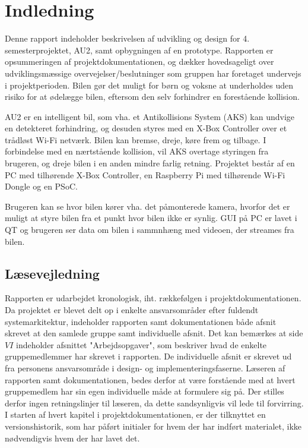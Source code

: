 \chapter{Indledning}
\label{ch:Indledning}

Denne rapport indeholder beskrivelsen af udvikling og design for 4. semesterprojektet, AU2, samt opbygningen af en prototype. 
Rapporten er opsummeringen af projektdokumentationen, og dækker hovedsageligt over udviklingsmæssige overvejelser/beslutninger som gruppen har foretaget undervejs i projektperioden. 
Bilen gør det muligt for børn og voksne at underholdes uden risiko for at ødelægge bilen, eftersom den selv forhindrer en forestående kollision.

AU2 er en intelligent bil, som vha. et Antikollisions System (AKS) kan undvige en detekteret forhindring, og desuden styres med en X-Box Controller over et trådløst Wi-Fi netværk. Bilen kan bremse, dreje, køre frem og tilbage.
I forbindelse med en nærtstående kollision, vil AKS overtage styringen fra brugeren, og dreje bilen i en anden mindre farlig retning. 
Projektet består af en PC med tilhørende X-Box Controller, en Raspberry Pi med tilhørende Wi-Fi Dongle og en PSoC. 

Brugeren kan se hvor bilen kører vha. det påmonterede kamera, hvorfor det er muligt at styre bilen fra et punkt hvor bilen ikke er synlig.
GUI på PC er lavet i QT og brugeren ser data om bilen i sammnhæng med videoen, der streames fra bilen.

\section{Læsevejledning}
Rapporten er udarbejdet kronologisk, iht. rækkefølgen i projektdokumentationen. 
Da projektet er blevet delt op i enkelte ansvarsområder efter fuldendt systemarkitektur, indeholder rapporten samt dokumentationen både afsnit skrevet at den samlede gruppe samt individuelle afsnit. 
Det kan bemærkes at side $VI$ indeholder afsnittet "Arbejdsopgaver", som beskriver hvad de enkelte gruppemedlemmer har skrevet i rapporten. 
De individuelle afsnit er skrevet ud fra personens ansvarsområde i design- og implementeringsfaserne. 
Læseren af rapporten samt dokumentationen, bedes derfor at være forstående med at hvert gruppemedlem har sin egen individuelle måde at formulere sig på. 
Der stilles derfor ingen retningslinjer til læseren, da dette sandsynligvis vil lede til forvirring. 
I starten af hvert kapitel i projektdokumentationen, er der tilknyttet en versionshistorik, som har påført initialer for hvem der har indført materialet, ikke nødvendigvis hvem der har lavet det.

